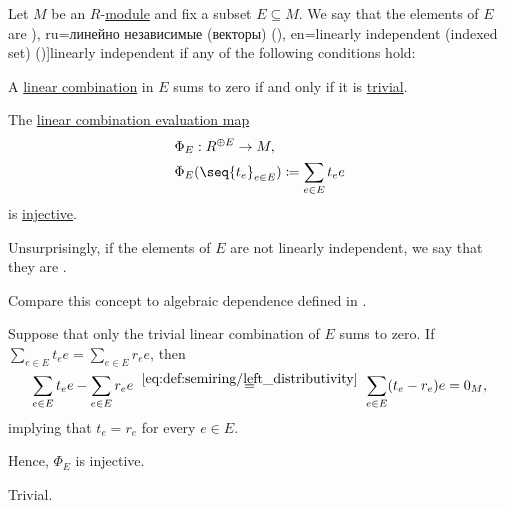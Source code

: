 \begin{definition}\label{def:linear_dependence}\mimprovised
  Let \( M \) be an \( R \)-\hyperref[def:module]{module} and fix a subset \( E \subseteq M \). We say that the elements of \( E \) are \term[bg=линейно независими (вектори) (\cite[94]{Обрешков1962ВисшаАлгебра}), ru=линейно независимые (векторы) (\cite[\S 3.4]{Тыртышников2007ЛинейнаяАлгебра}), en=linearly independent (indexed set) (\cite[def. VI.1.1]{Aluffi2009Algebra})]{linearly independent} if any of the following conditions hold:

  \begin{thmenum}
     A \hyperref[def:linear_combination]{linear combination} in \( E \) sums to zero if and only if it is \hyperref[def:free_semimodule]{trivial}.

     The \hyperref[thm:free_semimodule_universal_property]{linear combination evaluation map}
    \begin{equation*}
      \begin{aligned}
        &\Phi_E: R^{\oplus E} \to M, \\
        &\Phi_E( \seq{ t_e }_{e \in E} ) \coloneqq \sum_{e \in E} t_e e
      \end{aligned}
    \end{equation*}
    is \hyperref[def:function_invertibility/injective]{injective}.
  \end{thmenum}

  Unsurprisingly, if the elements of \( E \) are not linearly independent, we say that they are .
\end{definition}
\begin{comments}
  \item Compare this concept to algebraic dependence defined in .
\end{comments}
\begin{defproof}
   Suppose that only the trivial linear combination of \( E \) sums to zero. If \( \sum_{e \in E} t_e e = \sum_{e \in E} r_e e \), then
  \begin{equation*}
    \sum_{e \in E} t_e e - \sum_{e \in E} r_e e
    \reloset {\eqref{eq:def:semiring/left_distributivity}} =
    \sum_{e \in E} (t_e - r_e) e
    =
    0_M,
  \end{equation*}
  implying that \( t_e = r_e \) for every \( e \in E \).

  Hence, \( \Phi_E \) is injective.

   Trivial.
\end{defproof}

